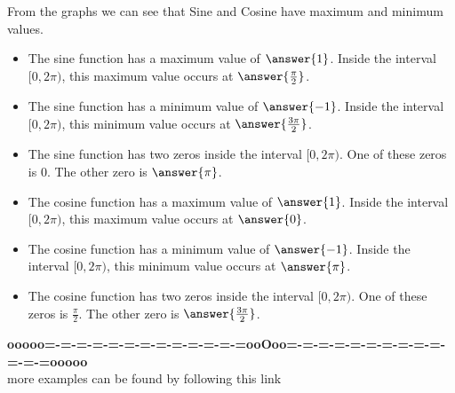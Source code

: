 \documentclass{ximera}
\begin{document}
From the graphs we can see that Sine and Cosine have maximum and minimum values.



\begin{explanation}
\begin{itemize}

  \item The sine function has a maximum value of $\answer{1}$.  Inside the interval $[0, 2\pi)$, this maximum value occurs at $\answer{\frac{\pi}{2}}$.

  \item The sine function has a minimum value of $\answer{-1}$.  Inside the interval $[0, 2\pi)$, this minimum value occurs at $\answer{\frac{3\pi}{2}}$.

  \item The sine function has two zeros inside the interval $[0, 2\pi)$. One of these zeros is $0$.  The other zero is $\answer{\pi}$.


\end{itemize}





\begin{itemize}
  
  \item The cosine function has a maximum value of $\answer{1}$.  Inside the interval $[0, 2\pi)$, this maximum value occurs at $\answer{0}$.

  \item The cosine function has a minimum value of $\answer{-1}$.  Inside the interval $[0, 2\pi)$, this minimum value occurs at $\answer{\pi}$.

  \item The cosine function has two zeros inside the interval $[0, 2\pi)$. One of these zeros is $\frac{\pi}{2}$.  The other zero is $\answer{\frac{3\pi}{2}}$.


\end{itemize}

\end{explanation}














\begin{center}
\textbf{\textcolor{green!50!black}{ooooo=-=-=-=-=-=-=-=-=-=-=-=-=ooOoo=-=-=-=-=-=-=-=-=-=-=-=-=ooooo}} \\

more examples can be found by following this link\\ 

\end{center}
\end{document}
